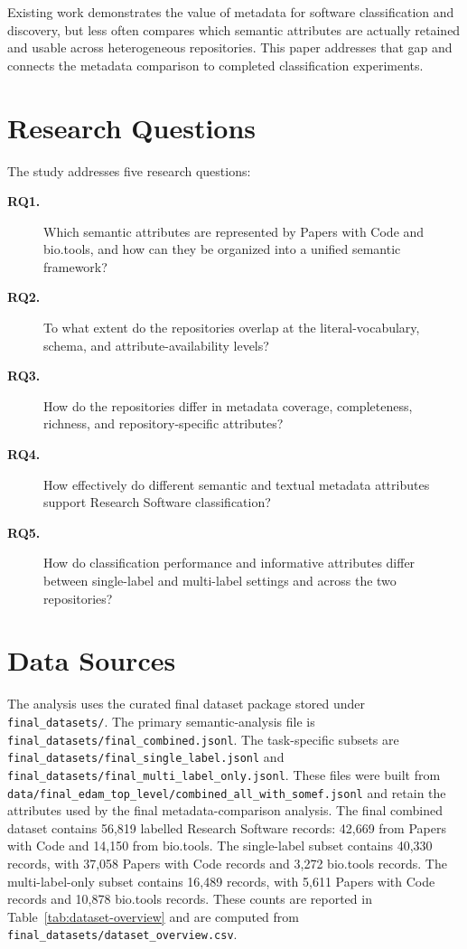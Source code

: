 \documentclass[pdflatex,sn-mathphys-num]{sn-jnl}%
\theoremstyle{thmstyleone}%
\theoremstyle{thmstyletwo}%
\theoremstyle{thmstylethree}%
\begin{document}
Existing work demonstrates the value of metadata for software classification and discovery, but less often compares which semantic attributes are actually retained and usable across heterogeneous repositories. This paper addresses that gap and connects the metadata comparison to completed classification experiments.

\section{Research Questions}
\label{sec:rq}

The study addresses five research questions:

\begin{description}
\item[\textbf{RQ1.}] Which semantic attributes are represented by Papers with Code and bio.tools, and how can they be organized into a unified semantic framework?
\item[\textbf{RQ2.}] To what extent do the repositories overlap at the literal-vocabulary, schema, and attribute-availability levels?
\item[\textbf{RQ3.}] How do the repositories differ in metadata coverage, completeness, richness, and repository-specific attributes?
\item[\textbf{RQ4.}] How effectively do different semantic and textual metadata attributes support Research Software classification?
\item[\textbf{RQ5.}] How do classification performance and informative attributes differ between single-label and multi-label settings and across the two repositories?
\end{description}

\section{Data Sources}
\label{sec:data}

The analysis uses the curated final dataset package stored under \texttt{final\_datasets/}. The primary semantic-analysis file is \texttt{final\_datasets/final\_combined.jsonl}. The task-specific subsets are \texttt{final\_datasets/final\_single\_label.jsonl} and \texttt{final\_datasets/final\_multi\_label\_only.jsonl}. These files were built from \texttt{data/final\_edam\_top\_level/combined\_all\_with\_somef.jsonl} and retain the attributes used by the final metadata-comparison analysis. The final combined dataset contains 56,819 labelled Research Software records: 42,669 from Papers with Code and 14,150 from bio.tools. The single-label subset contains 40,330 records, with 37,058 Papers with Code records and 3,272 bio.tools records. The multi-label-only subset contains 16,489 records, with 5,611 Papers with Code records and 10,878 bio.tools records. These counts are reported in Table~\ref{tab:dataset-overview} and are computed from \texttt{final\_datasets/dataset\_overview.csv}.
\end{document}
